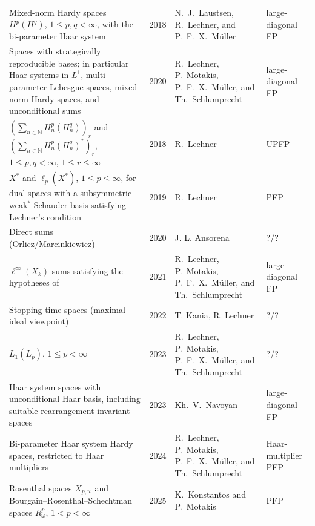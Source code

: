 \documentclass[11pt]{amsart}
\theoremstyle{plain}
\theoremstyle{definition}
\numberwithin{equation}{section}
\newcommand{\N}{\mathbb{N}}
\renewcommand{\le}{\leqslant}
\renewcommand{\leq}{\leqslant}
\begin{document}
\begin{longtable}{@{}L{0.30\textwidth}L{0.08\textwidth}L{0.29\textwidth}L{0.23\textwidth}@{}}
Mixed-norm Hardy spaces $H^p(H^q)$, $1\le p,q<\infty$, with the
bi-parameter Haar system & 2018 &
N.~J.~Laustsen, R.~Lechner, and P.~F.~X.~M\"uller
\cite{LaustsenLechnerMuller2018} & large-diagonal FP \\

Spaces with strategically reproducible bases; in particular Haar systems in
$L^1$, multi-parameter Lebesgue spaces, mixed-norm Hardy spaces, and
unconditional sums & 2020 &
R.~Lechner, P.~Motakis, P.~F.~X.~M\"uller, and Th.~Schlumprecht
\cite{LMMSS2020} & large-diagonal FP \\

$\left(\sum_{n\in\N} H_n^p(H_n^q)\right)_r$ and
$\left(\sum_{n\in\N} H_n^p(H_n^q)^*\right)_r$,
$1\le p,q<\infty$, $1\le r\le\infty$ & 2018 &
R.~Lechner \cite{Lechner2018Mixed} & UPFP \\

$X^*$ and $\ell_p(X^*)$, $1\le p\le\infty$, for dual spaces with a
subsymmetric weak$^*$ Schauder basis satisfying Lechner's condition & 2019 &
R.~Lechner \cite{Lechner2019Subsymmetric} & PFP \\

Direct sums (Orlicz/Marcinkiewicz) & 2020 &
J. L. Ansorena \cite{Ansorena2020} & ?/? \\

$\ell^\infty(X_k)$-sums satisfying the hypotheses of \cite{LMMSS2021} & 2021 &
R.~Lechner, P.~Motakis, P.~F.~X.~M\"uller, and Th.~Schlumprecht
\cite{LMMSS2021} & large-diagonal FP \\

Stopping-time spaces (maximal ideal viewpoint) & 2022 &
T. Kania, R. Lechner \cite{KaniaLechner2022} & ?/? \\

$L_1(L_p)$, $1 \leq p < \infty$ & 2023 &
R.~Lechner, P.~Motakis, P.~F.~X.~M\"uller, and Th.~Schlumprecht\cite{LMMSS2022} & ?/? \\

Haar system spaces with unconditional Haar basis, including suitable
rearrangement-invariant spaces & 2023 &
Kh.~V.~Navoyan \cite{Navoyan2023} & large-diagonal FP \\

Bi-parameter Haar system Hardy spaces, restricted to Haar multipliers & 2024 &
R.~Lechner, P.~Motakis, P.~F.~X.~M\"uller, and Th.~Schlumprecht
\cite{LMMSS2024} & Haar-multiplier PFP \\

Rosenthal spaces $X_{p,w}$ and Bourgain--Rosenthal--Schechtman spaces
$R_\omega^p$, $1<p<\infty$ & 2025 &
K.~Konstantos and P.~Motakis \cite{KonstantosMotakis2025Orthogonal} & PFP \\


\end{longtable}
\end{document}
